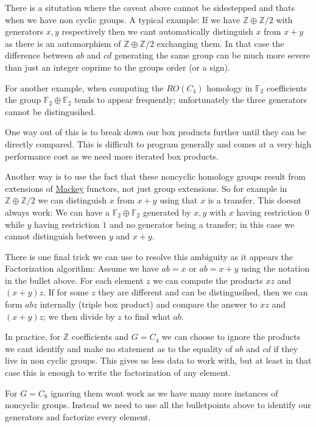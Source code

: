 \begin{DoxyItemize}
\item There is a situtation where the caveat above cannot be sidestepped and that\textquotesingle{}s when we have non cyclic groups. A typical example\+: If we have $\mathbb Z\oplus \mathbb Z/2$ with generators $x,y$ respectively then we can\textquotesingle{}t automatically distinguish $x$ from $x+y$ as there is an automorphism of $\mathbb Z\oplus \mathbb Z/2$ exchanging them. In that case the difference between $ab$ and $cd$ generating the same group can be much more severe than just an integer coprime to the group\textquotesingle{}s order (or a sign).
\item For another example, when computing the $RO(C_4)$ homology in $\mathbb F_2$ coefficients the group $\mathbb F_2\oplus \mathbb F_2$ tends to appear frequently; unfortunately the three generators cannot be distingusihed.
\item One way out of this is to break down our box products further until they can be directly compared. This is difficult to program generally and comes at a very high performance cost as we need more iterated box products.
\item Another way is to use the fact that these noncyclic homology groups result from extensions of \hyperlink{namespaceMackey}{Mackey} functors, not just group extensions. So for example in $\mathbb Z\oplus \mathbb Z/2$ we can distinguish $x$ from $x+y$ using that $x$ is a transfer. This doesn\textquotesingle{}t always work\+: We can have a $\mathbb F_2\oplus \mathbb F_2$ generated by $x,y$ with $x$ having restriction $0$ while $y$ having restriction $1$ and no generator being a transfer; in this case we cannot distinguish between $y$ and $x+y$.
\item There is one final trick we can use to resolve this ambiguity as it appears the Factorization algorithm\+: Assume we have $ab=x$ or $ab=x+y$ using the notation in the bullet above. For each element $z$ we can compute the products $xz$ and $(x+y)z$. If for some $z$ they are different and can be distingusihed, then we can form $abz$ internally (triple box product) and compare the answer to $xz$ and $(x+y)z$; we then divide by $z$ to find what $ab$.
\end{DoxyItemize}

In practice, for $\mathbb Z$ coefficients and $G=C_4$ we can choose to ignore the products we can\textquotesingle{}t identify and make no statement as to the equality of $ab$ and $cd$ if they live in non cyclic groups. This gives us less data to work with, but at least in that case this is enough to write the factorization of any element.

For $G=C_8$ ignoring them won\textquotesingle{}t work as we have many more instances of noncyclic groups. Instead we need to use all the bulletpoints above to identify our generators and factorize every element. 